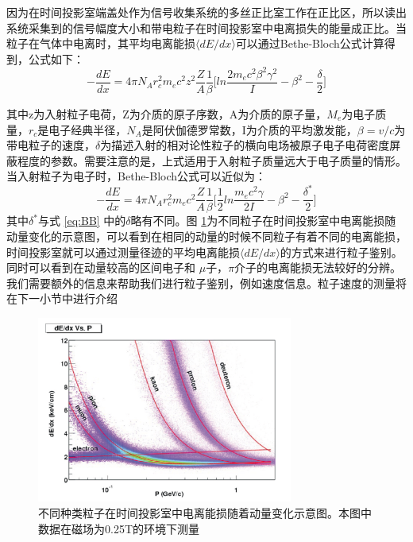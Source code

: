 因为在时间投影室端盖处作为信号收集系统的多丝正比室工作在正比区，所以读出系统采集到的信号幅度大小和带电粒子在时间投影室中电离损失的能量成正比。当粒子在气体中电离时，其平均电离能损$ \langle dE/dx \rangle $可以通过Bethe-Bloch公式计算得到，公式如下：
\begin{equation}
    -\frac{dE}{dx} = 4\pi N_A r_c^2 m_e c^2 z^2\frac{Z}{A}\frac{1}{\beta} \bigg[ ln\frac{2 m_e c^2 \beta^2 \gamma^2 }{I} - \beta^2 - \frac{\delta}{2} \bigg ]
    \label{eq:BB}
\end{equation}

其中z为入射粒子电荷，Z为介质的原子序数，A为介质的原子量，$M_e$为电子质量，$r_c$是电子经典半径，$N_A$是阿伏伽德罗常数，I为介质的平均激发能，$\beta = v/c$为带电粒子的速度，$\delta$为描述入射的相对论性粒子的横向电场被原子电子电荷密度屏蔽程度的参数。需要注意的是，上式适用于入射粒子质量远大于电子质量的情形。当入射粒子为电子时，Bethe-Bloch公式可以近似为：
\begin{equation}
    -\frac{dE}{dx} = 4\pi N_A r_c^2 m_e c^2 \frac{Z}{A}\frac{1}{\beta} \bigg[ \frac{1}{2}ln\frac{m_e c^2 \gamma }{2I} - \beta^2 - \frac{\delta^*}{2} \bigg ]
\end{equation}
其中$\delta^*$与式 \ref{eq:BB} 中的$\delta$略有不同。图 \ref{fig:dEdx}为不同粒子在时间投影室中电离能损随动量变化的示意图，可以看到在相同的动量的时候不同粒子有着不同的电离能损，时间投影室就可以通过测量径迹的平均电离能损$ \langle dE/dx \rangle $的方式来进行粒子鉴别。同时可以看到在动量较高的区间电子和 $\mu$子，$\pi$介子的电离能损无法较好的分辨。我们需要额外的信息来帮助我们进行粒子鉴别，例如速度信息。粒子速度的测量将在下一小节中进行介绍

\begin{figure}[htb]
    \begin{center}
    \includegraphics[width=0.75\textwidth,clip]{figures/Chapter2/dEdx.png}
    \end{center}
    \caption[粒子在时间投影室中的电离能损]{不同种类粒子在时间投影室中电离能损随着动量变化示意图。本图中数据在磁场为0.25T的环境下测量}
    \label{fig:dEdx}
\end{figure}




